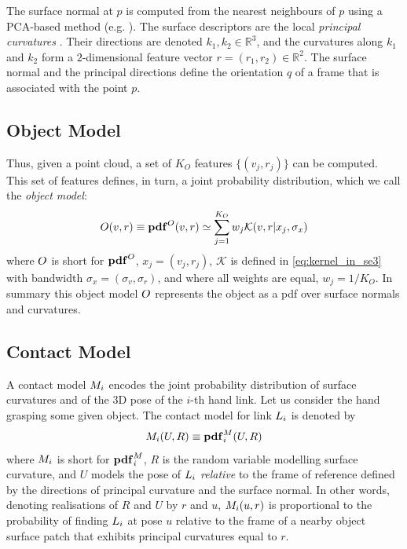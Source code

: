 The surface normal at $p$ is computed from the nearest neighbours of $p$ using a PCA-based method (e.g. \cite{kanatani2005statistical}). The surface descriptors are the local \emph{principal curvatures} \cite{spivak1979comprehensive}. Their directions are denoted $k_1, k_2 \in \mathbb R^3$, and the curvatures along $k_1$ and $k_2$ form a $2$-dimensional feature vector $r = (r_1, r_2) \in \mathbb R^2$. %
The surface normal and the principal directions define the orientation $q$ of a frame that is associated with the point $p$. 

\subsection{Object Model}
\label{sec:object_model}

Thus, given a point cloud, a set of $K_O$ features  $\lbrace (v_j, r_j) \rbrace$ can be computed. This set of features defines, in turn, a joint probability distribution, which we call the \emph{object model}:
\begin{equation}
O(v, r) \equiv \mathbf{pdf}^O(v, r) \simeq \sum_{j=1}^{K_O} w_j \mathcal{K}(v, r|{x_j}, \sigma_{x})
\label{eq:om}
\end{equation}
where $O$ is short for $\mathbf{pdf}^O$, $x_j = (v_j, r_j)$,  $\mathcal{K}$ is defined in \eq\eqref{eq:kernel_in_se3} with bandwidth $\sigma_{x} = (\sigma_{v}, \sigma_{r})$, and where all weights are equal, $w_j = 1/{K_O}$. In summary this object model $O$ represents the object as a pdf over surface normals and curvatures.

\subsection{Contact Model}\label{sec:contact.model}

A contact model $M_i$ encodes the joint probability distribution of surface curvatures and of the 3D pose of the $i$-th hand link. Let us consider the hand grasping some given object. The contact model for link $L_i$ is denoted by
\begin{equation}\label{eq:M}
M_i(U, R) \equiv \mathbf{pdf}^M_i(U, R)
\end{equation}
where $M_i$ is short for $\mathbf{pdf}^M_i$, $R$ is the random variable modelling surface curvature, and $U$ models the pose of $L_i$ \emph{relative} to the frame of reference defined by the directions of principal curvature and the surface normal. In other words, denoting realisations of $R$ and $U$ by $r$ and $u$, $M_i(u, r)$ is proportional to the probability of finding $L_i$ at pose $u$ relative to the frame of a nearby object surface patch that exhibits principal curvatures equal to $r$.

